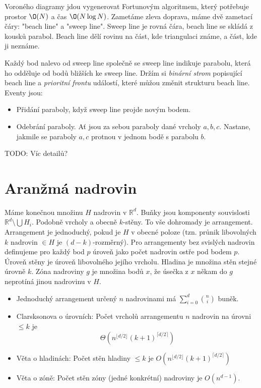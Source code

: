 \documentclass[a4paper,10pt,titlepage]{article} \usepackage[utf8]{inputenc}
\def\R{\mathbb{R}}
\begin{document}
Voroného diagramy jdou vygenerovat Fortunovým algoritmem, který potřebuje
prostor $\O(N)$ a čas $\O(N\log N)$. Zametáme zleva
doprava, máme dvě zametací čáry: "beach line" a "sweep line".
Sweep line je rovná čára, beach line se skládá z kousků parabol.
Beach line dělí rovinu na část, kde triangulaci známe, a část, kde ji neznáme.

Každý bod nalevo od sweep line společně se sweep line indikuje parabolu,
která ho odděluje od bodů bližších ke sweep line.
Držím si \emph{binární strom} popisující beach line a \emph{prioritní frontu}
událostí, které můžou změnit strukturu beach line.
Eventy jsou:
\begin{itemize}
\item Přidání paraboly, když sweep line projde novým bodem.
\item Odebrání paraboly. Ať jsou za sebou paraboly dané vrcholy $a,b,c$.
Nastane, jakmile se paraboly $a,c$ protnou v jednom bodě s parabolu $b$.
\end{itemize}

TODO: Víc detailů?

\section{Aranžmá nadrovin}
Máme konečnou množinu $H$ nadrovin v $\R^d$. Buňky jsou komponenty souvislosti
$\R^d \setminus \bigcup H_i$. Podobně vrcholy a obecně $k$-stěny. To vše dohromady
je arrangement. Arrangement je jednoduchý, pokud je $H$ v obecné poloze (tzn. průnik
libovolných $k$ nadrovin $\in H$ je $(d-k)$-rozměrný). Pro arrangementy bez svislých
nadrovin definujeme pro každý bod $p$ úroveň jako počet nadrovin ostře pod bodem $p$.
Úroveň stěny je úroveň libovolného jejího vrcholu. Hladina je množina stěn stejné
úrovně $k$. Zóna nadroviny $g$ je množina bodů $x$, že úsečka z $x$ někam do $g$
neprotíná jinou nadrovinu v $H$.

\begin{itemize}
\item Jednoduchý arrangement určený $n$ nadrovinami má $\sum\limits_{i=0}^d {n \choose i}$
buněk.
\item Clarsksonova o úrovních: Počet vrcholů arrangementu $n$ nadrovin na úrovni $\leq k$
je $$\Theta(n^{\lfloor d/2 \rfloor} (k+1)^{\lceil d/2 \rceil})$$
\item Věta o hladinách: Počet stěn hladiny $\leq k$ je \quad
$O(n^{\lfloor d/2 \rfloor} (k+1)^{\lceil d/2 \rceil})$
\item Věta o zóně: Počet stěn zóny (jedné konkrétní) nadroviny je $O(n^{d-1})$.
\end{itemize}
\end{document}
